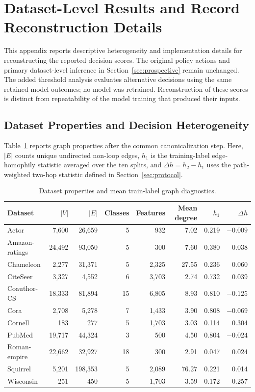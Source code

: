 \section{Dataset-Level Results and Record Reconstruction Details}
\label{app:reproducibility}

This appendix reports descriptive heterogeneity and implementation details for reconstructing the reported decision scores. The original policy actions and primary dataset-level inference in Section~\ref{sec:prospective} remain unchanged. The added threshold analysis evaluates alternative decisions using the same retained model outcomes; no model was retrained. Reconstruction of these scores is distinct from repeatability of the model training that produced their inputs.

\subsection{Dataset Properties and Decision Heterogeneity}

Table~\ref{tab:dataset_properties} reports graph properties after the common canonicalization step. Here, $|E|$ counts unique undirected non-loop edges, $h_1$ is the training-label edge-homophily statistic averaged over the ten splits, and $\Delta h=h_2-h_1$ uses the path-weighted two-hop statistic defined in Section~\ref{sec:protocol}.

\begin{table}[ht]
\centering
\caption{Dataset properties and mean train-label graph diagnostics.}
\label{tab:dataset_properties}
\scriptsize
\setlength{\tabcolsep}{3.2pt}
\begin{tabular}{@{}lrrrrrrr@{}}
\toprule
Dataset & $|V|$ & $|E|$ & Classes & Features & Mean degree & $h_1$ & $\Delta h$ \\
\midrule
Actor & 7,600 & 26,659 & 5 & 932 & 7.02 & 0.219 & $-0.009$ \\
Amazon-ratings & 24,492 & 93,050 & 5 & 300 & 7.60 & 0.380 & 0.038 \\
Chameleon & 2,277 & 31,371 & 5 & 2,325 & 27.55 & 0.236 & 0.060 \\
CiteSeer & 3,327 & 4,552 & 6 & 3,703 & 2.74 & 0.732 & 0.039 \\
Coauthor-CS & 18,333 & 81,894 & 15 & 6,805 & 8.93 & 0.810 & $-0.125$ \\
Cora & 2,708 & 5,278 & 7 & 1,433 & 3.90 & 0.808 & $-0.069$ \\
Cornell & 183 & 277 & 5 & 1,703 & 3.03 & 0.114 & 0.304 \\
PubMed & 19,717 & 44,324 & 3 & 500 & 4.50 & 0.804 & $-0.024$ \\
Roman-empire & 22,662 & 32,927 & 18 & 300 & 2.91 & 0.047 & 0.024 \\
Squirrel & 5,201 & 198,353 & 5 & 2,089 & 76.27 & 0.221 & 0.014 \\
Wisconsin & 251 & 450 & 5 & 1,703 & 3.59 & 0.172 & 0.257 \\
\bottomrule
\end{tabular}
\end{table}

